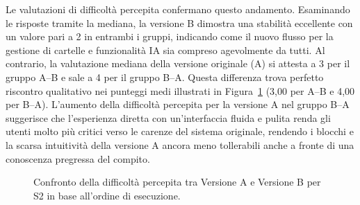 Le valutazioni di difficoltà percepita confermano questo andamento. Esaminando le risposte tramite la mediana, la versione B dimostra una stabilità eccellente con un valore pari a 2 in entrambi i gruppi, indicando come il nuovo flusso per la gestione di cartelle e funzionalità IA sia compreso agevolmente da tutti. Al contrario, la valutazione mediana della versione originale (A) si attesta a 3 per il gruppo A--B e sale a 4 per il gruppo B--A. Questa differenza trova perfetto riscontro qualitativo nei punteggi medi illustrati in Figura~\ref{fig:6-s2-2} (3,00 per A--B e 4,00 per B--A). L'aumento della difficoltà percepita per la versione A nel gruppo B--A suggerisce che l'esperienza diretta con un'interfaccia fluida e pulita renda gli utenti molto più critici verso le carenze del sistema originale, rendendo i blocchi e la scarsa intuitività della versione A ancora meno tollerabili anche a fronte di una conoscenza pregressa del compito.

\begin{figure}[H]
	\centering
	\caption{Confronto della difficoltà percepita tra Versione A e Versione B per S2 in base all'ordine di esecuzione.}
	\label{fig:6-s2-2}
\end{figure}
